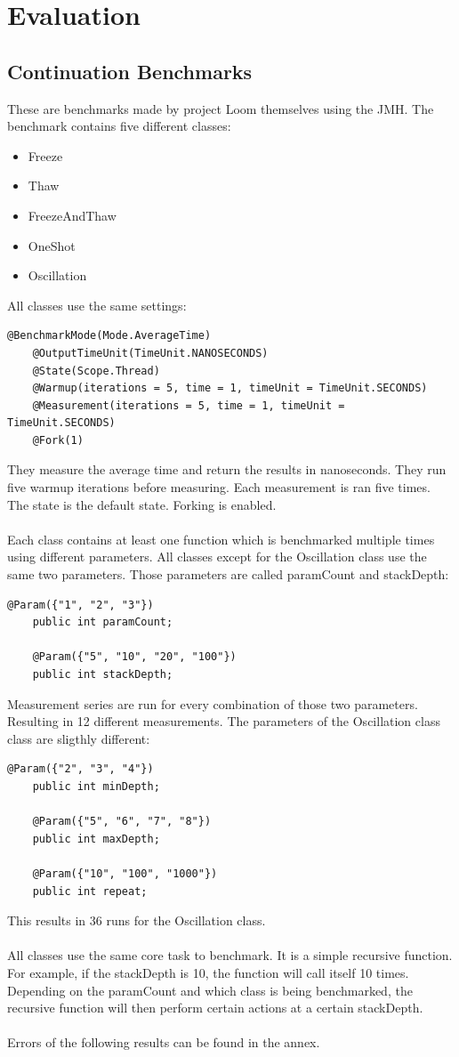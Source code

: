 \chapter{Evaluation}

\section{Continuation Benchmarks}
These are benchmarks made by project Loom themselves using the JMH.
The benchmark contains five different classes:
\begin{itemize}
  \item Freeze
  \item Thaw
  \item FreezeAndThaw
  \item OneShot
  \item Oscillation
\end{itemize}

All classes use the same settings:
\begin{lstlisting}[language=custom-java]
    @BenchmarkMode(Mode.AverageTime)
    @OutputTimeUnit(TimeUnit.NANOSECONDS)
    @State(Scope.Thread)
    @Warmup(iterations = 5, time = 1, timeUnit = TimeUnit.SECONDS)
    @Measurement(iterations = 5, time = 1, timeUnit = TimeUnit.SECONDS)
    @Fork(1)
\end{lstlisting}
They measure the average time and return the results in nanoseconds. They run five warmup iterations before measuring. Each measurement is ran five times. The state is the default state. Forking is enabled.
\\
\\
Each class contains at least one function which is benchmarked multiple times using different parameters.
All classes except for the Oscillation class use the same two parameters. Those parameters are called paramCount and stackDepth:
\begin{lstlisting}[language=custom-java]
    @Param({"1", "2", "3"})
    public int paramCount;
    
    @Param({"5", "10", "20", "100"})
    public int stackDepth;
\end{lstlisting}
Measurement series are run for every combination of those two parameters. Resulting in 12 different measurements.
The parameters of the Oscillation class class are sligthly different:
\begin{lstlisting}[language=custom-java]
    @Param({"2", "3", "4"})
    public int minDepth;
    
    @Param({"5", "6", "7", "8"})
    public int maxDepth;
    
    @Param({"10", "100", "1000"})
    public int repeat;
\end{lstlisting}
This results in 36 runs for the Oscillation class.
\\
\\
All classes use the same core task to benchmark. It is a simple recursive function. For example, if the stackDepth is 10, the function will call itself 10 times. Depending on the paramCount and which class is being benchmarked, the recursive function will then perform certain actions at a certain stackDepth.
\\
\\
Errors of the following results can be found in the annex.
